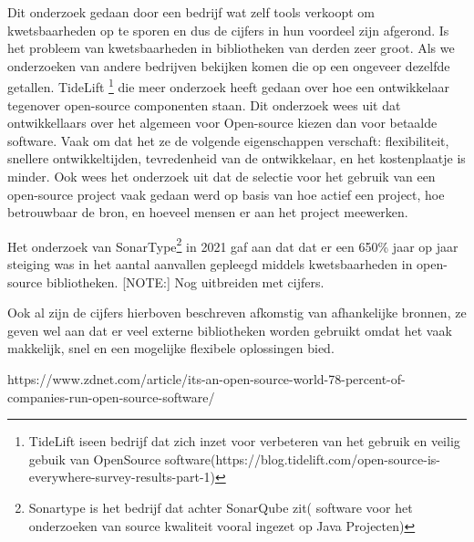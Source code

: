 Dit onderzoek gedaan door een bedrijf wat zelf tools verkoopt om kwetsbaarheden op te sporen en dus de cijfers in hun voordeel zijn afgerond. Is het probleem van kwetsbaarheden in bibliotheken van derden zeer groot. Als we onderzoeken van andere bedrijven bekijken komen die op een ongeveer dezelfde getallen. TideLift
\footnote{TideLift iseen bedrijf dat zich inzet voor verbeteren van het gebruik en veilig gebuik van OpenSource software(https://blog.tidelift.com/open-source-is-everywhere-survey-results-part-1)}
die meer onderzoek heeft gedaan over hoe een ontwikkelaar tegenover open-source componenten staan. Dit onderzoek wees uit dat ontwikkellaars over het algemeen voor Open-source kiezen dan voor betaalde software. Vaak om dat het ze de volgende eigenschappen verschaft:  flexibiliteit, snellere ontwikkeltijden, tevredenheid van de ontwikkelaar, en het kostenplaatje is minder. Ook wees het onderzoek uit dat de selectie voor het gebruik van een open-source project vaak gedaan werd op basis van hoe actief een project, hoe betrouwbaar de bron, en hoeveel mensen er aan het project meewerken.

Het onderzoek van SonarType\footnote{Sonartype is het bedrijf dat achter SonarQube zit( software voor het onderzoeken van source kwaliteit vooral ingezet op Java Projecten)} in 2021 gaf aan dat dat er een 650\% jaar op jaar steiging was in het aantal aanvallen gepleegd middels kwetsbaarheden in open-source bibliotheken.
[NOTE:] Nog uitbreiden met cijfers.

Ook al zijn de cijfers hierboven beschreven afkomstig van afhankelijke bronnen, ze geven wel aan dat er veel externe bibliotheken worden gebruikt omdat het vaak makkelijk, snel en een mogelijke flexibele oplossingen bied.

https://www.zdnet.com/article/its-an-open-source-world-78-percent-of-companies-run-open-source-software/


